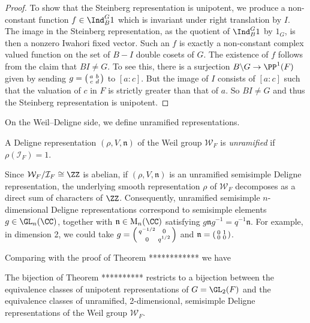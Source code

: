 \begin{proof}
    To show that the Steinberg representation is unipotent, we produce a non-constant function $f \in \Ind_B^G 1$ which is invariant under right translation by $I$. The image in the Steinberg representation, as the quotient of $\Ind_B^G 1$ by $1_G$, is then a nonzero Iwahori fixed vector. Such an $f$ is exactly a non-constant complex valued function on the set of $B-I$ double cosets of $G$. The existence of $f$ follows from the claim that $BI \neq G$. To see this, there is a surjection $B \backslash G \to \PP^1(F)$ given by sending $g=\begin{psmallmatrix}
        a&b\\c&d
    \end{psmallmatrix}$ to $[a:c]$. But the image of $I$ consists of $[a:c]$ such that the valuation of $c$ in $F$ is strictly greater than that of $a$. So $BI \neq G$ and thus the Steinberg representation is unipotent. 

\end{proof}

On the Weil--Deligne side, we define unramified representations.

\begin{defn}
    A Deligne representation $(\rho, V, \mathfrak n)$ of the Weil group $\mathcal W_F$ is \textit{unramified} if $\rho(\mathcal I_F)=1$.
\end{defn}
\begin{rem}
    Since $\mathcal W_F/\mathcal I_F \cong \ZZ$ is abelian, if $(\rho,V,\mathfrak n)$ is an unramified semisimple Deligne representation, the underlying smooth representation $\rho$ of $\mathcal W_F$ decomposes as a direct sum of characters of $\ZZ$. Consequently, unramified semisimple $n$-dimensional Deligne representations correspond to semisimple elements $g \in \GL_n(\CC)$, together with $\mathfrak n \in \mathrm{M}_n(\CC)$ satisfying $g \mathfrak n g^{-1} = q^{-1}\mathfrak n$. For example, in dimension 2, we could take $g=\begin{psmallmatrix}
        q^{-1/2} &0\\0&q^{1/2}
    \end{psmallmatrix} $ and $\mathfrak n = \begin{psmallmatrix}
        0&1\\0&0
    \end{psmallmatrix}$.
\end{rem}

Comparing with the proof of Theorem ************ we have

\begin{cor}
    The bijection of Theorem ********** restricts to a bijection between the equivalence classes of unipotent representations of $G=\GL_2(F)$ and the equivalence classes of unramified, 2-dimensional, semisimple Deligne representations of the Weil group $\mathcal W_F$.    
\end{cor}


